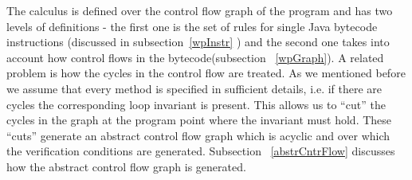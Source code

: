 The calculus is defined over the control flow graph of the program and has two levels of definitions - the first one is the set of rules for single Java bytecode instructions (discussed in subsection~\ref{wpInstr} ) and the second one takes into account how control
 flows in the bytecode(subsection ~\ref{wpGraph}). A related problem is how the cycles in the control flow are treated. 
As we mentioned before we assume that every method is specified in sufficient details, i.e. if there are cycles the corresponding 
loop invariant is present. This allows us to ``cut'' the cycles in the graph at the program point where the invariant must hold. 
These ``cuts'' generate an abstract control flow graph which is acyclic and over which the verification conditions are generated. Subsection ~\ref{abstrCntrFlow} discusses 
how the abstract control flow graph is generated.













